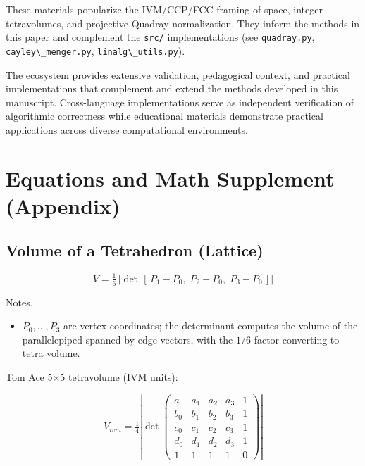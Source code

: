 \documentclass[
  10pt,
]{article}
\newcommand{\passthrough}[1]{#1}
\providecommand{\tightlist}{%
  \setlength{\itemsep}{0pt}\setlength{\parskip}{0pt}}
\begin{document}
These materials popularize the IVM/CCP/FCC framing of space, integer
tetravolumes, and projective Quadray normalization. They inform the
methods in this paper and complement the \passthrough{\lstinline!src/!}
implementations (see \passthrough{\lstinline!quadray.py!},
\passthrough{\lstinline!cayley\_menger.py!},
\passthrough{\lstinline!linalg\_utils.py!}).

The ecosystem provides extensive validation, pedagogical context, and
practical implementations that complement and extend the methods
developed in this manuscript. Cross-language implementations serve as
independent verification of algorithmic correctness while educational
materials demonstrate practical applications across diverse
computational environments.

\newpage

\hypertarget{equations-and-math-supplement-appendix}{%
\section{Equations and Math Supplement
(Appendix)}\label{equations-and-math-supplement-appendix}}

\hypertarget{volume-of-a-tetrahedron-lattice}{%
\subsection{Volume of a Tetrahedron
(Lattice)}\label{volume-of-a-tetrahedron-lattice}}

\begin{equation}\label{eq:lattice_det}
V = \tfrac{1}{6}\,\left|\det\,[\,P_1 - P_0,\; P_2 - P_0,\; P_3 - P_0\,]\right|
\end{equation}

Notes.

\begin{itemize}
\tightlist
\item
  \(P_0,\ldots,P_3\) are vertex coordinates; the determinant computes
  the volume of the parallelepiped spanned by edge vectors, with the
  \(1/6\) factor converting to tetra volume.
\end{itemize}

Tom Ace 5×5 tetravolume (IVM units):

\begin{equation}\label{eq:ace5x5}
V_{ivm} = \tfrac{1}{4} \left| \det \begin{pmatrix}
 a_0 & a_1 & a_2 & a_3 & 1 \\
 b_0 & b_1 & b_2 & b_3 & 1 \\
 c_0 & c_1 & c_2 & c_3 & 1 \\
 d_0 & d_1 & d_2 & d_3 & 1 \\
  1 & 1 & 1 & 1 & 0
\end{pmatrix} \right|
\end{equation}
\end{document}
